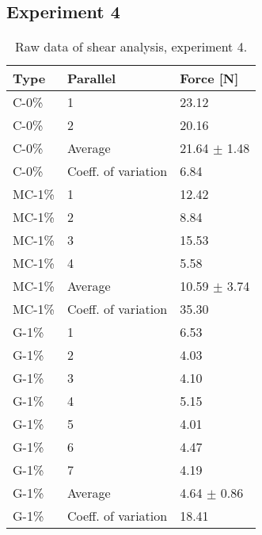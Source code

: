 \subsection{Experiment 4}
\begin{table}[H]
    \caption{Raw data of shear analysis, experiment 4.}
    \centering
    \begin{tabular}{ll|l}
\toprule

\textbf{Type} & \textbf{Parallel}  & \textbf{Force [N]}\\

\hline
C-0\%       &    1      & 23.12 \\
C-0\%       &    2      & 20.16 \\
C-0\%       & Average   & 21.64 $\pm$ 1.48\\
C-0\%       & Coeff. of variation & 6.84 \\
\hline
MC-1\%       &   1       & 12.42 \\
MC-1\%       &   2       & 8.84 \\
MC-1\%       &   3       & 15.53 \\
MC-1\%       &   4       & 5.58 \\
MC-1\%       & Average   & 10.59 $\pm$ 3.74 \\
MC-1\%       & Coeff. of variation & 35.30 \\
\hline
G-1\%       &  1       & 6.53 \\
G-1\%       &  2       & 4.03 \\
G-1\%       &  3       & 4.10 \\
G-1\%       &  4       & 5.15 \\
G-1\%       &  5       & 4.01 \\
G-1\%       &  6       & 4.47 \\
G-1\%       &  7       & 4.19 \\
G-1\%       & Average   & 4.64 $\pm$ 0.86 \\
G-1\%       & Coeff. of variation & 18.41 \\
\bottomrule
    \end{tabular}%
    \label{tab:RawData:ShearForce:Exp4}
\end{table}

